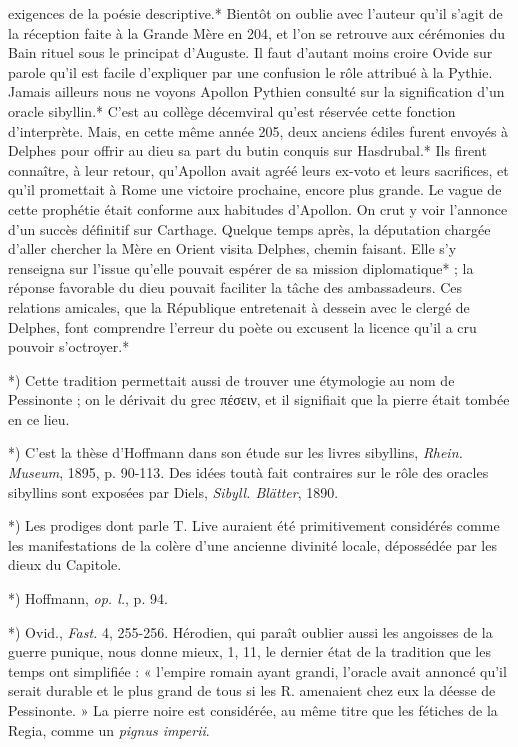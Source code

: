 \documentclass[a4paper, 11pt, oneside, polutonikogreek, french]{article}
\begin{document}
exigences de la poésie descriptive.* Bientôt on oublie avec l'auteur qu'il s'agit de la réception faite à la Grande Mère en 204, et l'on se retrouve aux cérémonies du Bain rituel sous le principat d'Auguste. Il faut d'autant moins croire Ovide sur parole qu'il est facile d'expliquer par une confusion le rôle attribué à la Pythie. Jamais ailleurs nous ne voyons Apollon Pythien consulté sur la signification d'un oracle sibyllin.* C'est au collège décemviral qu'est réservée cette fonction d'interprète. Mais, en cette même année 205, deux anciens édiles furent envoyés à Delphes pour offrir au dieu sa part du butin conquis sur Hasdrubal.* Ils firent connaître, à leur retour, qu'Apollon avait agréé leurs ex-voto et leurs sacrifices, et qu'il promettait à Rome une victoire prochaine, encore plus grande. Le vague de cette prophétie était conforme aux habitudes d'Apollon. On crut y voir l'annonce d'un succès définitif sur Carthage. Quelque temps après, la députation chargée d'aller chercher la Mère en Orient visita Delphes, chemin faisant. Elle s'y renseigna sur l'issue qu'elle pouvait espérer de sa mission diplomatique* ; la réponse favorable du dieu pouvait faciliter la tâche des ambassadeurs. Ces relations amicales, que la République entretenait à dessein avec le clergé de Delphes, font comprendre l'erreur du poète ou excusent la licence qu'il a cru pouvoir s'octroyer.*

*) Cette tradition permettait aussi de trouver une étymologie au nom de Pessinonte ; on le dérivait du grec πέσειν, et il signifiait que la pierre était tombée en ce lieu.

*) C'est la thèse d'Hoffmann dans son étude sur les livres sibyllins, \emph{Rhein. Museum}, 1895, p. 90-113. Des idées toutà fait contraires sur le rôle des oracles sibyllins sont exposées par Diels, \emph{Sibyll. Blätter}, 1890.

*) Les prodiges dont parle T. Live auraient été primitivement considérés comme les manifestations de la colère d'une ancienne divinité locale, dépossédée par les dieux du Capitole.

*) Hoffmann, \emph{op. l.}, p. 94.

*) Ovid., \emph{Fast.} 4, 255-256. Hérodien, qui paraît oublier aussi les angoisses de la guerre punique, nous donne mieux, 1, 11, le dernier état de la tradition que les temps ont simplifiée : « l'empire romain ayant grandi, l'oracle avait annoncé qu'il serait durable et le plus grand de tous si les R. amenaient chez eux la déesse de Pessinonte. » La pierre noire est considérée, au même titre que les fétiches de la Regia, comme un \emph{pignus imperii}.
\end{document}
